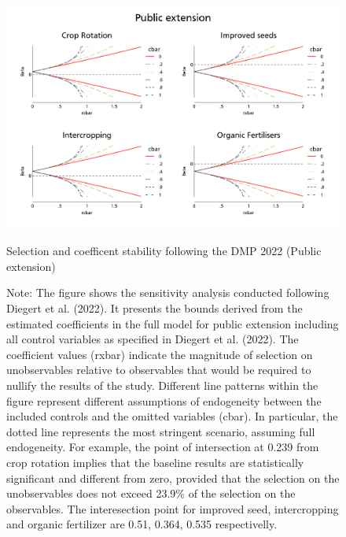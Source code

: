 \documentclass[
]{article}
\begin{document}
\pagebreak
\newpage

\begin{figure}[htbp]
\centering
\includegraphics[width=1\textwidth]{figures/combined_public.png}
\caption{Selection and coefficent stability following the DMP 2022 (Public extension)}
\caption*{Note: The figure shows the sensitivity analysis conducted following Diegert et al. (2022). It presents the bounds derived from the estimated coefficients in the full model for public extension including all control variables as specified in Diegert et al. (2022). The coefficient values (rxbar) indicate the magnitude of selection on unobservables relative to observables that would be required to nullify the results of the study. Different line patterns within the figure represent different assumptions of endogeneity between the included controls and the omitted variables (cbar). In particular, the dotted line represents the most stringent scenario, assuming full endogeneity. For example,  the point of intersection at 0.239 from crop rotation implies that the baseline results are statistically significant and different from zero, provided that the selection on the unobservables does not exceed 23.9\% of the selection on the observables. The interesection point for improved seed, intercropping and organic fertilizer are 0.51, 0.364, 0.535 respectivelly.}
\end{figure}

\pagebreak
\newpage
\end{document}
